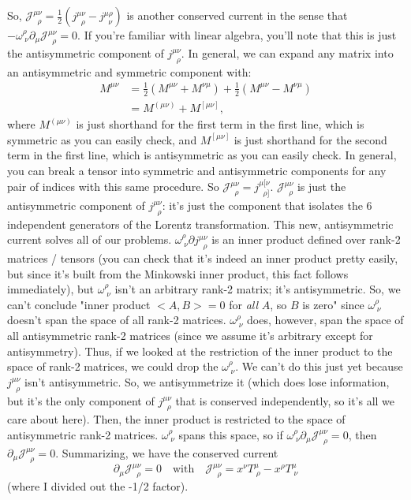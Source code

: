 So, $\mathcal{J}^{\mu\nu}_{\;\;\rho} = \frac{1}{2}\left(j^{\mu\nu}_{\;\;\rho} - j^{\mu\rho}_{\;\;\nu}\right)$ is another conserved current in the sense that $-\omega^{\rho}_{\;\nu}\partial_\mu\mathcal{J}^{\mu\nu}_{\;\;\rho}=0$. If you're familiar with linear algebra, you'll note that this is just the antisymmetric component of $j^{\mu\nu}_{\;\;\rho}$. In general, we can expand any matrix into an antisymmetric and symmetric component with:
\begin{align*}
    M^{\mu\nu} &= \frac{1}{2}(M^{\mu\nu}+M^{\nu\mu}) + \frac{1}{2}(M^{\mu\nu}-M^{\nu\mu})\\
    &= M^{(\mu\nu)} + M^{[\mu\nu]},
\end{align*}
where $M^{(\mu\nu)}$ is just shorthand for the first term in the first line, which is symmetric as you can easily check, and $M^{[\mu\nu]}$ is just shorthand for the second term in the first line, which is antisymmetric as you can easily check. In general, you can break a tensor into symmetric and antisymmetric components for any pair of indices with this same procedure. So $\mathcal{J}^{\mu\nu}_{\;\;\rho} = j^{\mu[\nu}_{\;\;\rho]}$. $\mathcal{J}^{\mu\nu}_{\;\;\rho}$ is just the antisymmetric component of $j^{\mu\nu}_{\;\;\rho}$: it's just the component that isolates the 6 independent generators of the Lorentz transformation. This new, antisymmetric current solves all of our problems. $\omega^\rho_{\;\nu}\partial j^{\mu\nu}_{\;\;\rho}$ is an inner product defined over rank-2 matrices / tensors (you can check that it's indeed an inner product pretty easily, but since it's built from the Minkowski inner product, this fact follows immediately), but $\omega^\rho_{\;\nu}$ isn't an arbitrary rank-2 matrix; it's antisymmetric. So, we can't conclude "inner product $<A,B> =0$ for \textit{all} $A$, so $B$ is zero" since $\omega^{\rho}_{\;\nu}$ doesn't span the space of all rank-2 matrices. $\omega^{\rho}_{\;\nu}$ does, however, span the space of all antisymmetric rank-2 matrices (since we assume it's arbitrary except for antisymmetry). Thus, if we looked at the restriction of  the inner product to the space of rank-2 matrices, we could drop the $\omega^{\rho}_{\;\nu}$. We can't do this just yet because $j^{\mu\nu}_{\;\;\rho}$ isn't antisymmetric. So, we antisymmetrize it (which does lose information, but it's the only component of $j^{\mu\nu}_{\;\;\rho}$ that is conserved independently, so it's all we care about here). Then, the inner product is restricted to the space of antisymmetric rank-2 matrices. $\omega^\rho_{\;\nu}$ spans this space, so if $\omega^{\rho}_{\;\nu}\partial_\mu \mathcal{J}^{\mu\nu}_{\;\;\rho}=0$, then $\partial_\mu\mathcal{J}^{\mu\nu}_{\;\;\rho}=0$. Summarizing, we have the conserved current
\[
    \partial_\mu\mathcal{J}^{\mu\nu}_{\;\;\rho} = 0 \quad\text{with}\quad \mathcal{J}^{\mu\nu}_{\;\;\rho} = x^\nu T^{\mu}_{\;\rho} - x^\rho T^{\mu}_{\;\nu}
\]
(where I divided out the -1/2 factor). \\

